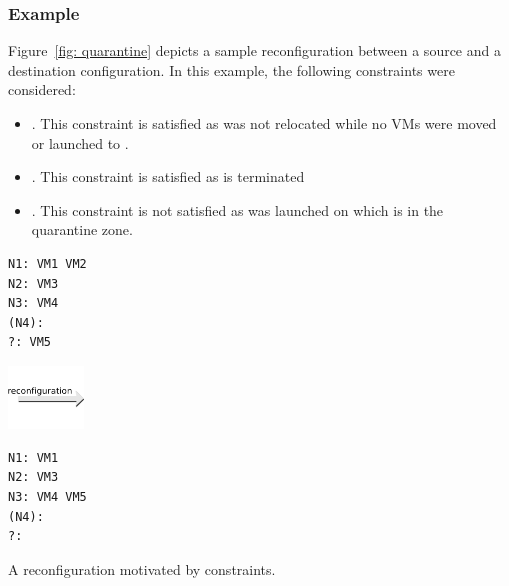 \subsubsection{Example}

Figure~\ref{fig: quarantine} depicts a sample reconfiguration between a source and a destination configuration. In this example, the following  constraints were considered:

\begin{itemize}

\item {}. This constraint is satisfied as  was not relocated while no VMs
were moved or launched to .
\item {}. This constraint is satisfied as  is terminated
\item {}. This constraint is not satisfied as  was launched on  which is in the quarantine zone.
\end{itemize}

\begin{reconfiguration}
\centering
\begin{minipage}[b]{0.40\textwidth}
\begin{lstlisting}
N1: VM1 VM2
N2: VM3
N3: VM4
(N4):
?: VM5
\end{lstlisting}
\end{minipage}
\begin{minipage}[b]{2cm}
\includegraphics[width=2cm]{img/arrow_reconfiguration}
\end{minipage}
\begin{minipage}[b]{0.40\textwidth}
\begin{lstlisting}
N1: VM1
N2: VM3
N3: VM4 VM5
(N4):
?:
\end{lstlisting}
\end{minipage}
\caption{A reconfiguration motivated by  constraints.}\label{fig: quarantine}
\end{reconfiguration}


